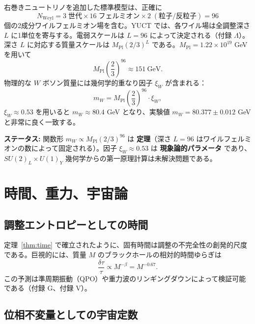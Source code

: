 \documentclass[12pt,a4paper]{article}
\begin{document}
	右巻きニュートリノを追加した標準模型は、正確に
	\begin{equation}
		N_{\mathrm{Weyl}} = 3\;\text{世代} \times 16\;\text{フェルミオン} \times 2\;(\text{粒子/反粒子}) = 96
	\end{equation}
	個の2成分ワイルフェルミオン場を含む。YUCT では、各ワイル場は全調整深さ \(L\) に1単位を寄与する。電弱スケールは \(L = 96\) によって決定される（付録 \(\Lambda\)）。深さ \(L\) に対応する質量スケールは \(M_{\mathrm{Pl}} (2/3)^{L}\) である。\(M_{\mathrm{Pl}} = 1.22 \times 10^{19}\) GeV を用いて
	\begin{equation}
		M_{\mathrm{Pl}} \left(\frac{2}{3}\right)^{96} \approx 151\ \mathrm{GeV}.
	\end{equation}
	物理的な \(W\) ボソン質量には幾何学的重なり因子 \(\xi_W\) が含まれる：
	\begin{equation}
		m_W = M_{\mathrm{Pl}} \left(\frac{2}{3}\right)^{96} \cdot \xi_W,
		\label{eq:mw}
	\end{equation}
	\(\xi_W \approx 0.53\) を用いると \(m_W \approx 80.4\) GeV となり、実験値 \(m_W = 80.377 \pm 0.012\) GeV と非常に良く一致する。
	
	\textbf{ステータス:} 関数形 \(m_W \propto M_{\mathrm{Pl}} (2/3)^{96}\) は \textbf{定理}（深さ \(L=96\) はワイルフェルミオンの数によって固定される）。因子 \(\xi_W \approx 0.53\) は \textbf{現象論的パラメータ} であり、\(SU(2)_L \times U(1)_Y\) 幾何学からの第一原理計算は未解決問題である。
	
	\section{時間、重力、宇宙論}
	\label{sec:cosmology}
	
	\subsection{調整エントロピーとしての時間}
	
	定理~\ref{thm:time} で確立されたように、固有時間は調整の不完全性の創発的尺度である。巨視的には、質量 \(M\) のブラックホールの相対的時間ゆらぎは
	\begin{equation}
		\boxed{\frac{\delta \tau}{\tau} \propto M^{-\beta} = M^{-0.67}}.
	\end{equation}
	この予測は準周期振動（QPO）や重力波のリンギングダウンによって検証可能である（付録 G、付録 V）。
	
	\subsection{位相不変量としての宇宙定数}
	
\end{document}
